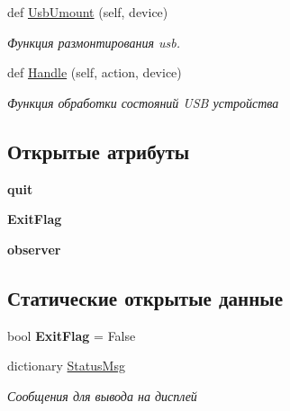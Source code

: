 \begin{DoxyCompactItemize}
def \mbox{\hyperlink{classisofc-service_1_1DeviceHandler_aaaa9fa346a748b4acded6cc698cd5c31}{Usb\+Umount}} (self, device)
\begin{DoxyCompactList}\small\item\em Функция размонтирования usb. \end{DoxyCompactList}\item 
def \mbox{\hyperlink{classisofc-service_1_1DeviceHandler_ace0b9c671ec50f9e343a2ab3dc39203e}{Handle}} (self, action, device)
\begin{DoxyCompactList}\small\item\em Функция обработки состояний U\+SB устройства \end{DoxyCompactList}\end{DoxyCompactItemize}
\subsection*{Открытые атрибуты}
\begin{DoxyCompactItemize}
\item 
\mbox{\label{classisofc-service_1_1DeviceHandler_aca19cb30a27a1352836b3fe6dfa9d347}} 
{\bfseries quit}
\item 
\mbox{\label{classisofc-service_1_1DeviceHandler_a924f7fb2ce60b6d7c0cf1ae12f8c99f7}} 
{\bfseries Exit\+Flag}
\item 
\mbox{\label{classisofc-service_1_1DeviceHandler_a69d7a83a92fa887dc5455bd624ec6f17}} 
{\bfseries observer}
\end{DoxyCompactItemize}
\subsection*{Статические открытые данные}
\begin{DoxyCompactItemize}
\item 
\mbox{\label{classisofc-service_1_1DeviceHandler_a400ab1f0978eacc7cc3bd5d6bac10ca7}} 
bool {\bfseries Exit\+Flag} = False
\item 
dictionary \mbox{\hyperlink{classisofc-service_1_1DeviceHandler_a23d3bade1a4584ff598cfc9bd7cafc8b}{Status\+Msg}}
\begin{DoxyCompactList}\small\item\em Сообщения для вывода на дисплей \end{DoxyCompactList}\end{DoxyCompactItemize}


